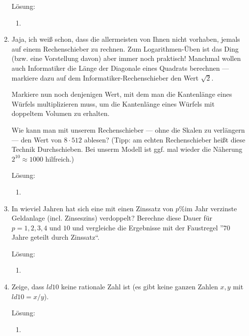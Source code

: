 \documentclass[../main.tex]{subfiles}
\begin{document}
\begin{enumerate}
	      Lösung:
	      \begin{enumerate}
		      \item
	      \end{enumerate}
	\item Jaja, ich weiß schon, dass die allermeisten von Ihnen nicht vorhaben, jemals auf einem Rechenschieber zu rechnen.
	      Zum Logarithmen-Üben ist das Ding (bzw. eine Vorstellung davon) aber immer noch praktisch!
	      Manchmal wollen auch Informatiker die Länge der Diagonale eines Quadrats berechnen — markiere dazu auf dem
	      Informatiker-Rechenschieber den Wert \(
	      \sqrt{2}
	      \).

	      Markiere nun noch denjenigen Wert, mit dem man die Kantenlänge eines Würfels multiplizieren muss,
	      um die Kantenlänge eines Würfels mit doppeltem Volumen zu erhalten.

	      Wie kann man mit unserem Rechenschieber — ohne die Skalen zu verlängern —
	      den Wert von \(
	      8 \cdot 512
	      \) ablesen?
	      (Tipp: am echten Rechenschieber heißt diese Technik Durchschieben. Bei unserm Modell ist ggf.
	      mal wieder die Näherung \(
	      2^{10} \approx 1000
	      \) hilfreich.)

	      Lösung:
	      \begin{enumerate}
		      \item
	      \end{enumerate}
	\item In wieviel Jahren hat sich eine mit einen Zinssatz von \(
	      p\%
	      \)im Jahr verzinste Geldanlage (incl. Zinseszins) verdoppelt?
	      Berechne diese Dauer für \(
	      p = 1,2,3,4
	      \) und \(
	      10
	      \) und vergleiche die Ergebnisse mit der Faustregel ”\(
	      70
	      \) Jahre geteilt durch Zinssatz“.

	      Lösung:
	      \begin{enumerate}
		      \item
	      \end{enumerate}
	\item Zeige, dass \(
	      ld 10
	      \) keine rationale Zahl ist (es gibt keine ganzen Zahlen \(
	      x , y
	      \) mit \(
	      ld 10 = x / y
	      \)).

	      Lösung:
	      \begin{enumerate}
		      \item
	      \end{enumerate}
\end{enumerate}
\end{document}
